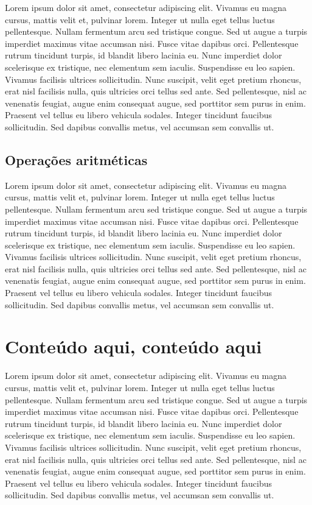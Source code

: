 Lorem ipsum dolor sit amet, consectetur adipiscing elit. Vivamus eu magna cursus, mattis velit et, pulvinar lorem. Integer ut nulla eget tellus luctus pellentesque. Nullam fermentum arcu sed tristique congue. Sed ut augue a turpis imperdiet maximus vitae accumsan nisi. Fusce vitae dapibus orci. Pellentesque rutrum tincidunt turpis, id blandit libero lacinia eu. Nunc imperdiet dolor scelerisque ex tristique, nec elementum sem iaculis. Suspendisse eu leo sapien. Vivamus facilisis ultrices sollicitudin. Nunc suscipit, velit eget pretium rhoncus, erat nisl facilisis nulla, quis ultricies orci tellus sed ante. Sed pellentesque, nisl ac venenatis feugiat, augue enim consequat augue, sed porttitor sem purus in enim. Praesent vel tellus eu libero vehicula sodales. Integer tincidunt faucibus sollicitudin. Sed dapibus convallis metus, vel accumsan sem convallis ut.

\subsection{Operações aritméticas}
Lorem ipsum dolor sit amet, consectetur adipiscing elit. Vivamus eu magna cursus, mattis velit et, pulvinar lorem. Integer ut nulla eget tellus luctus pellentesque. Nullam fermentum arcu sed tristique congue. Sed ut augue a turpis imperdiet maximus vitae accumsan nisi. Fusce vitae dapibus orci. Pellentesque rutrum tincidunt turpis, id blandit libero lacinia eu. Nunc imperdiet dolor scelerisque ex tristique, nec elementum sem iaculis. Suspendisse eu leo sapien. Vivamus facilisis ultrices sollicitudin. Nunc suscipit, velit eget pretium rhoncus, erat nisl facilisis nulla, quis ultricies orci tellus sed ante. Sed pellentesque, nisl ac venenatis feugiat, augue enim consequat augue, sed porttitor sem purus in enim. Praesent vel tellus eu libero vehicula sodales. Integer tincidunt faucibus sollicitudin. Sed dapibus convallis metus, vel accumsan sem convallis ut.

\section{Conteúdo aqui, conteúdo aqui}
\label{sec:java}

Lorem ipsum dolor sit amet, consectetur adipiscing elit. Vivamus eu magna cursus, mattis velit et, pulvinar lorem. Integer ut nulla eget tellus luctus pellentesque. Nullam fermentum arcu sed tristique congue. Sed ut augue a turpis imperdiet maximus vitae accumsan nisi. Fusce vitae dapibus orci. Pellentesque rutrum tincidunt turpis, id blandit libero lacinia eu. Nunc imperdiet dolor scelerisque ex tristique, nec elementum sem iaculis. Suspendisse eu leo sapien. Vivamus facilisis ultrices sollicitudin. Nunc suscipit, velit eget pretium rhoncus, erat nisl facilisis nulla, quis ultricies orci tellus sed ante. Sed pellentesque, nisl ac venenatis feugiat, augue enim consequat augue, sed porttitor sem purus in enim. Praesent vel tellus eu libero vehicula sodales. Integer tincidunt faucibus sollicitudin. Sed dapibus convallis metus, vel accumsan sem convallis ut.

